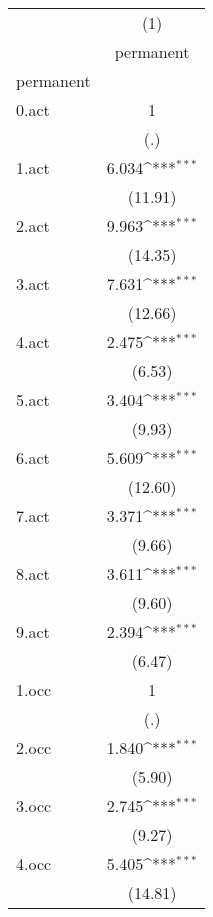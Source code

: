 {
\def\sym#1{\ifmmode^{#1}\else\(^{#1}\)\fi}
\begin{tabular}{l*{1}{c}}
\hline\hline
            &\multicolumn{1}{c}{(1)}\\
            &\multicolumn{1}{c}{permanent}\\
\hline
permanent   &                     \\
0.act       &           1         \\
            &         (.)         \\
[1em]
1.act       &       6.034\sym{***}\\
            &     (11.91)         \\
[1em]
2.act       &       9.963\sym{***}\\
            &     (14.35)         \\
[1em]
3.act       &       7.631\sym{***}\\
            &     (12.66)         \\
[1em]
4.act       &       2.475\sym{***}\\
            &      (6.53)         \\
[1em]
5.act       &       3.404\sym{***}\\
            &      (9.93)         \\
[1em]
6.act       &       5.609\sym{***}\\
            &     (12.60)         \\
[1em]
7.act       &       3.371\sym{***}\\
            &      (9.66)         \\
[1em]
8.act       &       3.611\sym{***}\\
            &      (9.60)         \\
[1em]
9.act       &       2.394\sym{***}\\
            &      (6.47)         \\
[1em]
1.occ       &           1         \\
            &         (.)         \\
[1em]
2.occ       &       1.840\sym{***}\\
            &      (5.90)         \\
[1em]
3.occ       &       2.745\sym{***}\\
            &      (9.27)         \\
[1em]
4.occ       &       5.405\sym{***}\\
            &     (14.81)         \\

\end{tabular}}
